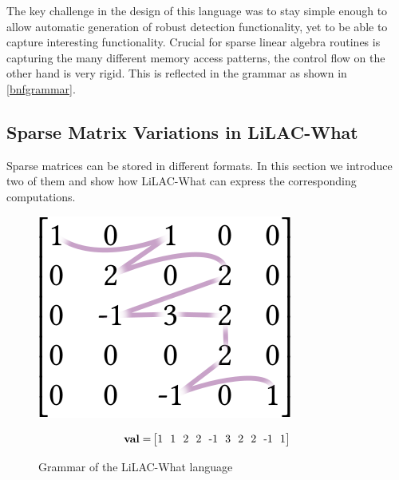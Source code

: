The key challenge in the design of this language was to stay simple enough
to allow automatic generation of robust detection functionality, yet to be able
to capture interesting functionality.
Crucial for sparse linear algebra routines is capturing the many different
memory access patterns, the control flow on the other hand is very rigid.
This is reflected in the grammar as shown in \autoref{bnfgrammar}.

\subsection{Sparse Matrix Variations in LiLAC-What}
Sparse matrices can be stored in different formats.
In this section we introduce two of them and show how LiLAC-What can express
the corresponding computations.

\begin{figure}[p]

\vspace{-1.5em}
\caption{Grammar of the LiLAC-What language}
\label{bnfgrammar}
\vspace{1.5em}
\begin{minipage}[b]{0.3\linewidth}
\includegraphics[width=0.9\linewidth]{figures/csrorder.png}
\vspace{0.04em}
\end{minipage}
\begin{minipage}[b]{0.65\linewidth}
\begin{align*}
\text{\bf val} =& \begin{bmatrix}
1\ \ 1\ \ 2\ \ 2\ \ \text{-}1\ \ 3\ \ 2\ \ 2\ \ \text{-}1\ \ 1\\
\end{bmatrix}\\

\end{align*}
\end{minipage}
\end{figure}
